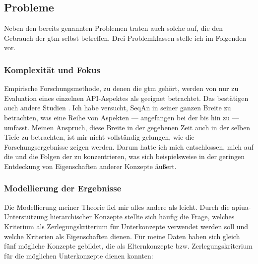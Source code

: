 \subsection{Probleme}

Neben den bereits genannten Problemen traten auch solche auf, die den Gebrauch der \gls{gtm} selbst betreffen. Drei Problemklassen stelle ich im Folgenden vor.


\subsubsection{Komplexität und Fokus}
\label{sec:schwierigkeiten-breite}

Empirische Forschungsmethode, zu denen die \gls{gtm} gehört, werden von \cite{SIGCHI:2009up} nur zu Evaluation eines einzelnen API-Aspektes als geeignet betrachtet. Das bestätigen auch andere Studien \citep[vgl. u.a.][]{Stylos:2008jt,Beaton:2008jn,Beaton:2008ix,Ellis:2007kv,Stylos:2007jb}. Ich habe versucht, SeqAn in seiner ganzen Breite zu betrachten, was eine Reihe von Aspekten --- angefangen bei der  bis hin zu  --- umfasst. Meinen Anspruch, diese Breite in der gegebenen Zeit auch in der selben Tiefe zu betrachten, ist mir nicht vollständig gelungen, wie die Forschungsergebnisse zeigen werden. Darum hatte ich mich entschlossen, mich auf die  und die Folgen der  zu konzentrieren, was sich beispielsweise in der geringen Entdeckung von Eigenschaften anderer Konzepte äußert.


\subsubsection{Modellierung der Ergebnisse}
\label{sec:gtm-modellierung}

Die Modellierung meiner Theorie fiel mir alles andere als leicht. Durch die \gls{apiua}-Unterstützung hierarchischer Konzepte stellte sich häufig die Frage, welches Kriterium als Zerlegungskriterium für Unterkonzepte verwendet werden soll und welche Kriterien als Eigenschaften dienen. Für meine Daten haben sich gleich fünf mögliche Konzepte gebildet, die als Elternkonzepte bzw. Zerlegungskriterium für die möglichen Unterkonzepte dienen konnten:

